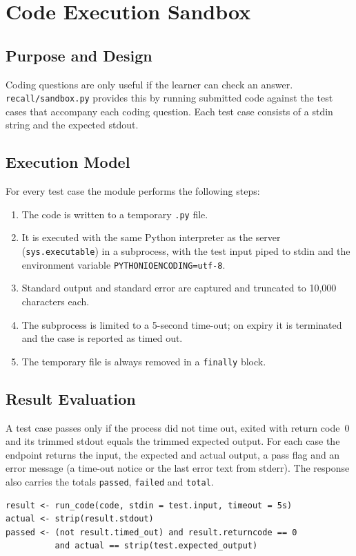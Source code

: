 \chapter{Code Execution Sandbox}

\section{Purpose and Design}
Coding questions are only useful if the learner can check an answer. \texttt{recall/sandbox.py} provides this by running submitted code against the test cases that accompany each coding question. Each test case consists of a stdin string and the expected stdout.

\section{Execution Model}
For every test case the module performs the following steps:
\begin{enumerate}
\item The code is written to a temporary \texttt{.py} file.
\item It is executed with the same Python interpreter as the server (\texttt{sys.executable}) in a subprocess, with the test input piped to stdin and the environment variable \texttt{PYTHONIOENCODING=utf-8}.
\item Standard output and standard error are captured and truncated to 10{,}000 characters each.
\item The subprocess is limited to a 5-second time-out; on expiry it is terminated and the case is reported as timed out.
\item The temporary file is always removed in a \texttt{finally} block.
\end{enumerate}

\section{Result Evaluation}
A test case passes only if the process did not time out, exited with return code~0 and its trimmed stdout equals the trimmed expected output. For each case the endpoint returns the input, the expected and actual output, a pass flag and an error message (a time-out notice or the last error text from stderr). The response also carries the totals \texttt{passed}, \texttt{failed} and \texttt{total}.

\begin{lstlisting}[style=pseudo, caption={Evaluation of one test case}, label={lst:tc}]
result <- run_code(code, stdin = test.input, timeout = 5s)
actual <- strip(result.stdout)
passed <- (not result.timed_out) and result.returncode == 0
          and actual == strip(test.expected_output)
\end{lstlisting}

